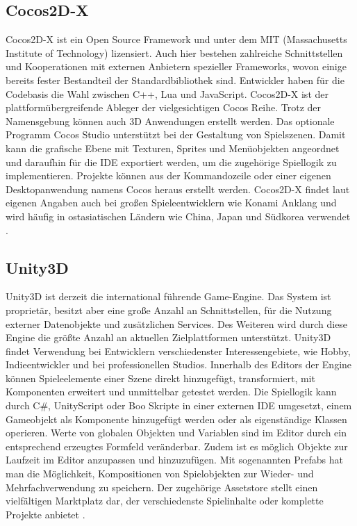 \subsection{Cocos2D-X}
Cocos2D-X ist ein Open Source Framework und unter dem MIT (Massachusetts Institute of Technology) lizensiert. Auch hier bestehen zahlreiche Schnittstellen und Kooperationen mit externen Anbietern spezieller Frameworks, wovon einige bereits fester Bestandteil der Standardbibliothek sind. Entwickler haben für die Codebasis die Wahl zwischen C++, Lua und JavaScript. Cocos2D-X ist der plattformübergreifende Ableger der vielgesichtigen Cocos Reihe. Trotz der Namensgebung können auch 3D Anwendungen erstellt werden. Das optionale Programm Cocos Studio unterstützt bei der Gestaltung von Spielszenen. Damit kann die grafische Ebene mit Texturen, Sprites und Menüobjekten angeordnet und daraufhin für die IDE exportiert werden, um die zugehörige Spiellogik zu implementieren. Projekte können aus der Kommandozeile oder einer eigenen Desktopanwendung namens Cocos heraus erstellt werden. Cocos2D-X findet laut eigenen Angaben auch bei großen Spieleentwicklern wie Konami Anklang und wird häufig in ostasiatischen Ländern wie China, Japan und Südkorea verwendet \citep{cocos2d_main_features}. 


\subsection{Unity3D}
Unity3D ist derzeit die international führende Game-Engine. Das System ist proprietär, besitzt aber eine große Anzahl an Schnittstellen, für die Nutzung externer Datenobjekte und zusätzlichen Services. Des Weiteren wird durch diese Engine die größte Anzahl an aktuellen Zielplattformen unterstützt. Unity3D findet Verwendung bei Entwicklern verschiedenster Interessengebiete, wie Hobby, Indieentwickler und bei professionellen Studios. Innerhalb des Editors der Engine können Spieleelemente einer Szene direkt hinzugefügt, transformiert, mit Komponenten erweitert und unmittelbar getestet werden. Die Spiellogik kann durch C\#, UnityScript oder Boo Skripte in einer externen IDE umgesetzt, einem Gameobjekt als Komponente hinzugefügt werden oder als eigenständige Klassen operieren. Werte von globalen Objekten und Variablen sind im Editor durch ein entsprechend erzeugtes Formfeld veränderbar. Zudem ist es möglich Objekte zur Laufzeit im Editor anzupassen und hinzuzufügen. Mit sogenannten Prefabs hat man die Möglichkeit, Kompositionen von Spielobjekten zur Wieder- und Mehrfachverwendung zu speichern. Der zugehörige Assetstore stellt einen vielfältigen Marktplatz dar, der verschiedenste Spielinhalte oder komplette Projekte anbietet \citep{unity_public_relations}. 


